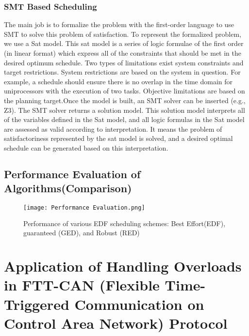 \documentclass[conference]{IEEEtran}
\begin{document}
\subsubsection{SMT Based Scheduling}
The main job is to formalize the problem with the first-order language to use SMT to solve this problem of satisfaction. To represent the formalized problem, we use a Sat model. This sat model is a series of logic formulae of the first order (in linear format) which express all of the constraints that should be met in the desired optimum schedule. Two types of limitations exist system constraints and target restrictions. System restrictions are based on the system in question. For example, a schedule should ensure there is no overlap in the time domain for uniprocessors with the execution of two tasks. Objective limitations are based on the planning target.Once the model is built, an SMT solver can be inserted (e.g., Z3). The SMT solver returns a solution model. This solution model interprets all of the variables defined in the Sat model, and all logic formulas in the Sat model are assessed as valid according to interpretation. It means the problem of satisfactoriness represented by the sat model is solved, and a desired optimal schedule can be generated based on this interpretation.\cite{7515899}

\subsection{Performance Evaluation of Algorithms(Comparison)}
\begin{figure}[htp]
    \centering
    \texttt{[image: Performance Evaluation.png]}
    \caption{Performance of various EDF scheduling schemes: Best Effort(EDF), guaranteed (GED), and Robust (RED){\cite{buttazzo2011hard}}}
    \label{fig:reg-gen}
\end{figure}


\section{Application of Handling Overloads in FTT-CAN (Flexible Time-Triggered Communication on Control Area Network) Protocol}
\end{document}
